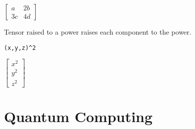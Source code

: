 \documentclass[12pt]{article}
\begin{document}
\noindent
$\begin{bmatrix}a&2b\\3c&4d\end{bmatrix}$

\bigskip
\noindent
Tensor raised to a power raises each component to the power.

{\color{blue}\begin{verbatim}
(x,y,z)^2
\end{verbatim}}

\noindent
$\begin{bmatrix}x^2\\y^2\\z^2\end{bmatrix}$

\newpage

















\newpage

\section{Quantum Computing}



\newpage



\newpage


\end{document}

